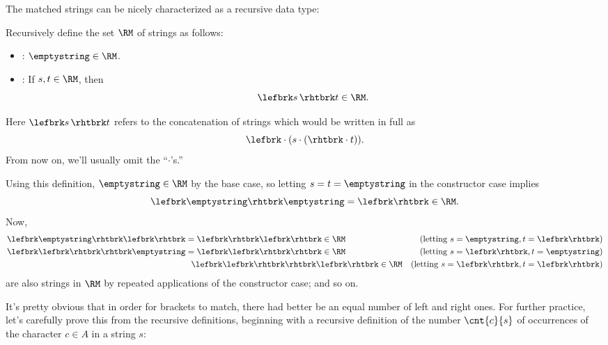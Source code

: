 The matched strings can be nicely characterized as a recursive data type:

\begin{definition}\label{RM_def}\label{RM-def}
Recursively define the set $\RM$ of strings as follows:
\begin{itemize}

\item {}: $\emptystring \in\RM$.

\item {}: If $s,t \in\RM$, then
\[
\lefbrk s\, \rhtbrk t \in \RM.
\]
\end{itemize}

\end{definition}

Here $\lefbrk s\, \rhtbrk t$ refers to the concatenation of
strings which would be written in full as
\[
\lefbrk \cdot (s \cdot (\rhtbrk \cdot t)).
\]
From now on, we'll usually omit the ``$\cdot$'s.'' 

Using this definition, $\emptystring \in\RM$ by the base
case, so letting $s=t =\emptystring$ in the constructor case implies
\[
\lefbrk\emptystring\rhtbrk\emptystring=\lefbrk\rhtbrk\in\RM.
\]
Now,
\begin{align*}
\lefbrk\emptystring\rhtbrk\lefbrk\rhtbrk &= \lefbrk\rhtbrk\lefbrk\rhtbrk \in \RM
    & \text{(letting $s = \emptystring, t = \lefbrk\rhtbrk$)}\\
\lefbrk\lefbrk\rhtbrk\rhtbrk\emptystring & = \lefbrk\lefbrk\rhtbrk\rhtbrk \in \RM
    & \text{(letting $s = \lefbrk\rhtbrk, t = \emptystring$)}\\
&\ \ \lefbrk\lefbrk\rhtbrk\rhtbrk\lefbrk\rhtbrk \in \RM
    & \text{(letting $s = \lefbrk\rhtbrk, t = \lefbrk\rhtbrk$)}
\end{align*}
are also strings in $\RM$ by repeated applications of the constructor
case; and so on.

\iffalse
If you haven't seen this kind of definition before, you should
try continuing this example to verify that
$\lefbrk\lefbrk\lefbrk\rhtbrk\rhtbrk\lefbrk\rhtbrk\rhtbrk\lefbrk\rhtbrk
\in \RM$.
\fi


\iffalse
Given the way this section is set up you might guess that $\RM = \GC$,
and you'd be right, but it's not completely obvious.  The proof is worked
out in Problem~\ref{PS_bracket_good_count}.
\fi

It's pretty obvious that in order for brackets to match, there had
better be an equal number of left and right ones.  For further
practice, let's carefully prove this from the recursive definitions,
beginning with a recursive definition of the number $\cnt{c}{s}$ of
occurrences of the character $c \in A$ in a string $s$:

